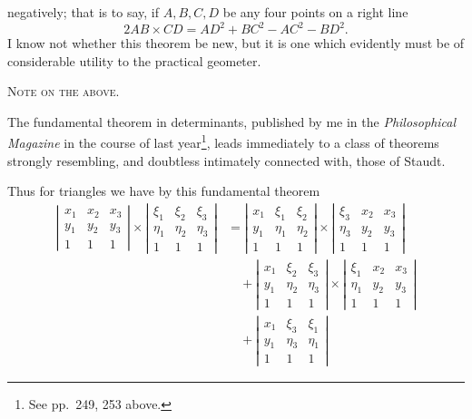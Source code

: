 \documentclass[11pt]{article}
\newcommand{\subpaperhead}[1]{\begin{center}{\large\scshape #1}\end{center}}
\newcommand{\sourcepage}[1]{\marginpar{\scriptsize p.~#1}}
\begin{document}
{{\sourcepage{389}
negatively; that is to say, if $A,B,C,D$ be any four points on a right line
\[
2AB\times CD=AD^2+BC^2-AC^2-BD^2.
\]
I know not whether this theorem be new, but it is one which evidently must be of considerable utility to the practical geometer.

\subpaperhead{Note on the above.}

The fundamental theorem in determinants, published by me in the \emph{Philosophical Magazine} in the course of last year\footnote{See pp.~249, 253 above.}, leads immediately to a class of theorems strongly resembling, and doubtless intimately connected with, those of Staudt.

Thus for triangles we have by this fundamental theorem
\[
\begin{aligned}
\left|\begin{array}{ccc}x_1&x_2&x_3\\ y_1&y_2&y_3\\1&1&1\end{array}\right|
\times
\left|\begin{array}{ccc}\xi_1&\xi_2&\xi_3\\ \eta_1&\eta_2&\eta_3\\1&1&1\end{array}\right|
&=
\left|\begin{array}{ccc}x_1&\xi_1&\xi_2\\ y_1&\eta_1&\eta_2\\1&1&1\end{array}\right|
\times
\left|\begin{array}{ccc}\xi_3&x_2&x_3\\ \eta_3&y_2&y_3\\1&1&1\end{array}\right|\\
&\quad+
\left|\begin{array}{ccc}x_1&\xi_2&\xi_3\\ y_1&\eta_2&\eta_3\\1&1&1\end{array}\right|
\times
\left|\begin{array}{ccc}\xi_1&x_2&x_3\\ \eta_1&y_2&y_3\\1&1&1\end{array}\right|\\
&\quad+
\left|\begin{array}{ccc}x_1&\xi_3&\xi_1\\ y_1&\eta_3&\eta_1\\1&1&1\end{array}\right|

\end{aligned}\]}}
\end{document}
